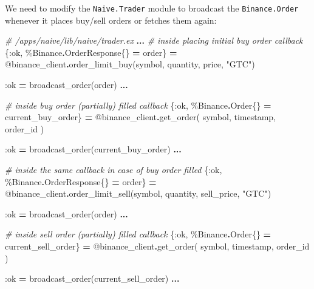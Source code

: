 \documentclass[
]{book}
\newenvironment{Shaded}{\begin{snugshade}}{\end{snugshade}}
\newcommand{\CommentTok}[1]{\textcolor[rgb]{0.56,0.35,0.01}{\textit{#1}}}
\newcommand{\ConstantTok}[1]{\textcolor[rgb]{0.00,0.00,0.00}{#1}}
\newcommand{\NormalTok}[1]{#1}
\newcommand{\OperatorTok}[1]{\textcolor[rgb]{0.81,0.36,0.00}{\textbf{#1}}}
\newcommand{\OtherTok}[1]{\textcolor[rgb]{0.56,0.35,0.01}{#1}}
\newcommand{\StringTok}[1]{\textcolor[rgb]{0.31,0.60,0.02}{#1}}
\newcommand{\VariableTok}[1]{\textcolor[rgb]{0.00,0.00,0.00}{#1}}
\begin{document}
We need to modify the \texttt{Naive.Trader} module to broadcast the \texttt{Binance.Order} whenever it places buy/sell orders or fetches them again:

\begin{Shaded}
\begin{Highlighting}[]
    \CommentTok{\# /apps/naive/lib/naive/trader.ex}
    \OperatorTok{...}
    \CommentTok{\# inside placing initial buy order callback}
\NormalTok{    \{}\VariableTok{:ok}\NormalTok{, \%}\ConstantTok{Binance}\OperatorTok{.}\ConstantTok{OrderResponse}\NormalTok{\{\} }\OperatorTok{=}\NormalTok{ order\} }\OperatorTok{=}
      \OtherTok{@binance\_client}\OperatorTok{.}\NormalTok{order\_limit\_buy(symbol, quantity, price, }\StringTok{"GTC"}\NormalTok{)}

    \VariableTok{:ok} \OperatorTok{=}\NormalTok{ broadcast\_order(order)}
    \OperatorTok{...}

    \CommentTok{\# inside buy order (partially) filled callback}
\NormalTok{    \{}\VariableTok{:ok}\NormalTok{, \%}\ConstantTok{Binance}\OperatorTok{.}\ConstantTok{Order}\NormalTok{\{\} }\OperatorTok{=}\NormalTok{ current\_buy\_order\} }\OperatorTok{=}
      \OtherTok{@binance\_client}\OperatorTok{.}\NormalTok{get\_order(}
\NormalTok{        symbol,}
\NormalTok{        timestamp,}
\NormalTok{        order\_id}
\NormalTok{      )}

    \VariableTok{:ok} \OperatorTok{=}\NormalTok{ broadcast\_order(current\_buy\_order)}
    \OperatorTok{...}

        \CommentTok{\# inside the same callback in case of buy order filled}
\NormalTok{        \{}\VariableTok{:ok}\NormalTok{, \%}\ConstantTok{Binance}\OperatorTok{.}\ConstantTok{OrderResponse}\NormalTok{\{\} }\OperatorTok{=}\NormalTok{ order\} }\OperatorTok{=}
          \OtherTok{@binance\_client}\OperatorTok{.}\NormalTok{order\_limit\_sell(symbol, quantity, sell\_price, }\StringTok{"GTC"}\NormalTok{)}
        
        \VariableTok{:ok} \OperatorTok{=}\NormalTok{ broadcast\_order(order)}
    \OperatorTok{...}

    \CommentTok{\# inside sell order (partially) filled callback}
\NormalTok{    \{}\VariableTok{:ok}\NormalTok{, \%}\ConstantTok{Binance}\OperatorTok{.}\ConstantTok{Order}\NormalTok{\{\} }\OperatorTok{=}\NormalTok{ current\_sell\_order\} }\OperatorTok{=}
      \OtherTok{@binance\_client}\OperatorTok{.}\NormalTok{get\_order(}
\NormalTok{        symbol,}
\NormalTok{        timestamp,}
\NormalTok{        order\_id}
\NormalTok{      )}
    
    \VariableTok{:ok} \OperatorTok{=}\NormalTok{ broadcast\_order(current\_sell\_order)}
    \OperatorTok{...}
\end{Highlighting}
\end{Shaded}
\end{document}

